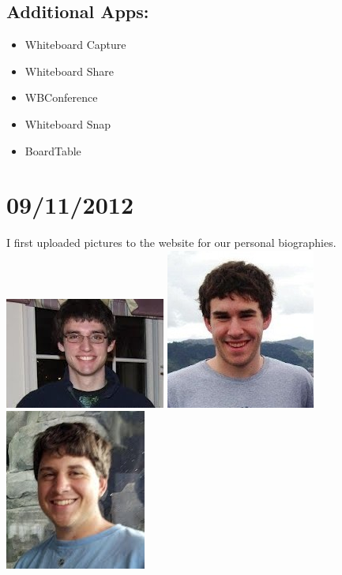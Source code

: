\documentclass[]{article}
\begin{document}
		\subsection{Additional Apps:}
			\begin{itemize}
				\item Whiteboard Capture
				\item Whiteboard Share
				\item WBConference
				\item Whiteboard Snap
				\item BoardTable
			\end{itemize}

	
	\section{09/11/2012}
		I first uploaded pictures to the website for our personal biographies.
		\\
		\includegraphics{images/Griffin.jpg}
		\includegraphics{images/Colin.jpg}
		\includegraphics{images/Phil.jpg}
		\\
\end{document}
